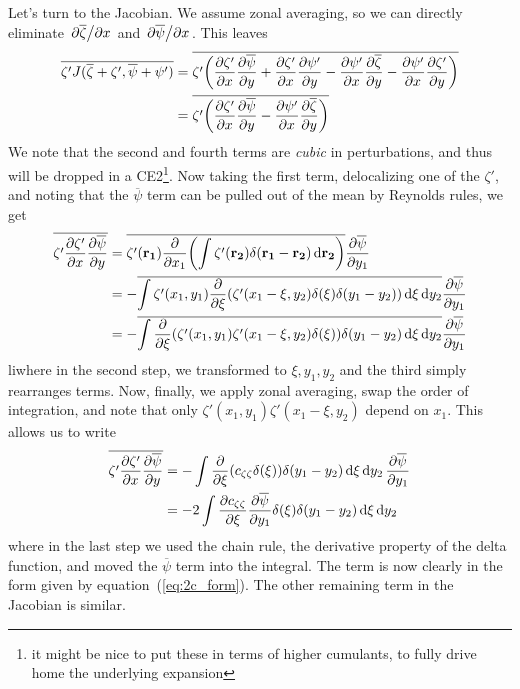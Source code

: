 \documentclass{paper}
\newcommand*{\reynolds}[1]{\mean{#1} + #1'}
\newcommand*{\mean}[1]{\overline{#1}}
\newcommand*{\qderiv}[3][]{\pdv{#2}{x_{#1}}\pdv{#3}{y_{#1}}}
\newcommand{\czz}{c_{\zeta\zeta}}
\newcommand{\rr}[1]{\vb{r_{#1}}}
\begin{document}
Let's turn to the Jacobian. We assume zonal averaging, so we can directly eliminate $\pdv*{\mean{\zeta}}{x}$ and $\pdv*{\mean{\psi}}{x}$. This leaves
\begin{equation}
  \label{eq:2c_jacobian}
  \begin{split}
    \mean{\zeta' J(\reynolds{\zeta}, \reynolds{\psi})} &= \mean{\zeta'\qty(\qderiv{\zeta'}{\mean{\psi}} + \qderiv{\zeta'}{\psi'} - \qderiv{\psi'}{\mean{\zeta}} - \qderiv{\psi'}{\zeta'})}\\
    &= \mean{\zeta'\qty(\qderiv{\zeta'}{\mean{\psi}} - \qderiv{\psi'}{\mean{\zeta}})}\\
  \end{split}
\end{equation}
We note that the second and fourth terms are \emph{cubic} in perturbations, and thus will be dropped in a CE2\footnote{it might be nice to put these in terms of higher cumulants, to fully drive home the underlying expansion}. Now taking the first term, delocalizing one of the $\zeta'$, and noting that the $\mean{\psi}$ term can be pulled out of the mean by Reynolds rules, we get
\begin{equation}
  \label{eq:2c_delocalize}
  \begin{split}
    \mean{\zeta' \qderiv{\zeta'}{\mean{\psi}}} &= \mean{\zeta'(\rr1) \pdv{x_1} \qty(\int \zeta'(\rr2) \delta(\rr1 - \rr2) \dd{\rr2})} \pdv{\mean{\psi}}{y_1}\\
    &= -\mean{\int \zeta'(x_1, y_1) \pdv{\xi} \qty(\zeta'(x_1 - \xi, y_2)  \delta(\xi)\delta(y_1 - y_2)) \dd{\xi} \dd{y_2}} \pdv{\mean{\psi}}{y_1}\\
    &= -\mean{\int \pdv{\xi} \qty(\zeta'(x_1, y_1) \zeta'(x_1 - \xi, y_2)  \delta(\xi)) \delta(y_1 - y_2) \dd{\xi} \dd{y_2}} \pdv{\mean{\psi}}{y_1}
  \end{split}
\end{equation}
liwhere in the second step, we transformed to $\xi, y_1, y_2$ and the third simply rearranges terms. Now, finally, we apply zonal averaging, swap the order of integration, and note that only $\zeta'(x_1, y_1) \zeta'(x_1 - \xi, y_2)$ depend on $x_1$. This allows us to write
\begin{equation}
  \label{eq:2c_delocalize_final}
  \begin{split}
    \mean{\zeta' \qderiv{\zeta'}{\mean{\psi}}} &= -\int \pdv{\xi}\qty(\czz \delta(\xi)) \delta(y_1 - y_2) \dd{\xi} \dd{y_2} \pdv{\mean{\psi}}{y_1}\\
   & = - 2\int \pdv{\czz}{\xi} \pdv{\mean{\psi}}{y_1} \delta(\xi) \delta(y_1 - y_2) \dd{\xi} \dd{y_2} 
  \end{split}
\end{equation}
where in the last step we used the chain rule, the derivative property of the delta function, and moved the $\mean{\psi}$ term into the integral. The term is now clearly in the form given by equation~(\ref{eq:2c_form}). The other remaining term in the Jacobian is similar.
\end{document}
